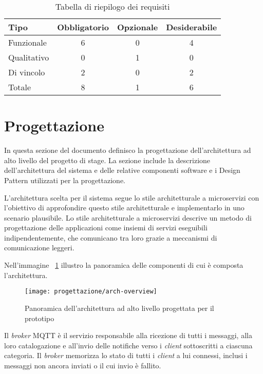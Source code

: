 \begin{table}[H]
\caption{Tabella di riepilogo dei requisiti}
\label{tab:requisiti-riepilogo}
\begin{tabularx}{\linewidth}{|X|c|c|c|}
\hline
\textbf{Tipo} & \textbf{Obbligatorio} & \textbf{Opzionale} & \textbf{Desiderabile} \\
\hline
Funzionale & 6 & 0 & 4 \\
\hline
Qualitativo & 0 & 1 & 0 \\
\hline
Di vincolo & 2 & 0 & 2 \\
\hline
Totale & 8 & 1 & 6 \\
\hline
\end{tabularx}
\end{table}

\pagebreak

\section{Progettazione}


In questa sezione del documento definisco la progettazione dell'architettura ad alto livello del progetto di stage.
La sezione include la descrizione dell'architettura del sistema e delle relative componenti software e i Design Pattern utilizzati per la progettazione.


L'architettura scelta per il sistema segue lo stile architetturale a microservizi con l'obiettivo di approfondire questo stile architetturale e implementarlo in uno scenario plausibile.
Lo stile architetturale a microservizi descrive un metodo di progettazione delle applicazioni come insiemi di servizi eseguibili indipendentemente, che comunicano tra loro grazie a meccanismi di comunicazione leggeri.

Nell'immagine ~\ref{img:overview-arch} illustro la panoramica delle componenti di cui è composta l'architettura.

\begin{figure}[H]
    \centering
    \texttt{[image: progettazione/arch-overview]}
    \caption{Panoramica dell'architettura ad alto livello progettata per il prototipo}
    \label{img:overview-arch}
\end{figure}


Il \emph{broker} MQTT è il servizio responsabile alla ricezione di tutti i messaggi, alla loro catalogazione e all'invio delle notifiche verso i \emph{client} sottoscritti a ciascuna categoria.
Il \emph{broker} memorizza lo stato di tutti i \emph{client} a lui connessi, inclusi i messaggi non ancora inviati o il cui invio è fallito.

